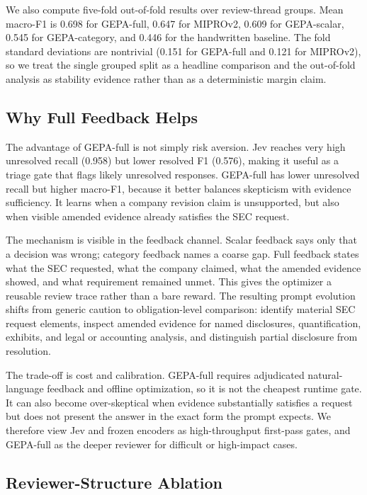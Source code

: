\documentclass[11pt]{article}
\begin{document}
We also compute five-fold out-of-fold results over review-thread groups. Mean macro-F1 is 0.698 for GEPA-full, 0.647 for MIPROv2, 0.609 for GEPA-scalar, 0.545 for GEPA-category, and 0.446 for the handwritten baseline. The fold standard deviations are nontrivial (0.151 for GEPA-full and 0.121 for MIPROv2), so we treat the single grouped split as a headline comparison and the out-of-fold analysis as stability evidence rather than as a deterministic margin claim.

\subsection{Why Full Feedback Helps}

The advantage of GEPA-full is not simply risk aversion. Jev reaches very high unresolved recall (0.958) but lower resolved F1 (0.576), making it useful as a triage gate that flags likely unresolved responses. GEPA-full has lower unresolved recall but higher macro-F1, because it better balances skepticism with evidence sufficiency. It learns when a company revision claim is unsupported, but also when visible amended evidence already satisfies the SEC request.

The mechanism is visible in the feedback channel. Scalar feedback says only that a decision was wrong; category feedback names a coarse gap. Full feedback states what the SEC requested, what the company claimed, what the amended evidence showed, and what requirement remained unmet. This gives the optimizer a reusable review trace rather than a bare reward. The resulting prompt evolution shifts from generic caution to obligation-level comparison: identify material SEC request elements, inspect amended evidence for named disclosures, quantification, exhibits, and legal or accounting analysis, and distinguish partial disclosure from resolution.

The trade-off is cost and calibration. GEPA-full requires adjudicated natural-language feedback and offline optimization, so it is not the cheapest runtime gate. It can also become over-skeptical when evidence substantially satisfies a request but does not present the answer in the exact form the prompt expects. We therefore view Jev and frozen encoders as high-throughput first-pass gates, and GEPA-full as the deeper reviewer for difficult or high-impact cases.

\subsection{Reviewer-Structure Ablation}
\end{document}
